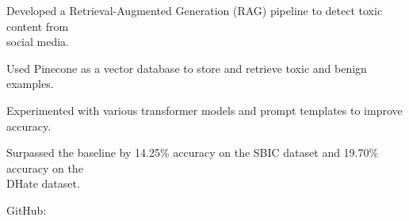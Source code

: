 \begin{resume_list}
  \item Developed a Retrieval-Augmented Generation (RAG) pipeline to detect toxic content from \\
  social media.
  \item Used Pinecone as a vector database to store and retrieve toxic and benign examples.
  \item Experimented with various transformer models and prompt templates to improve accuracy.
  \item Surpassed the baseline by 14.25\% accuracy on the SBIC dataset and 19.70\% accuracy on the \\
  DHate dataset.
  \item GitHub: 
\end{resume_list}
